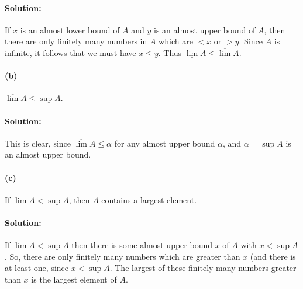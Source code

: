 \documentclass{article}
\begin{document}
\paragraph{Solution:} If $x$ is an almost lower bound of $A$ and $y$ is an
almost upper bound of $A$, then there are only finitely many numbers in $A$
which are $< x$ or $> y$. Since $A$ is infinite, it follows that we must have
$x \leq y$. Thus $\underline{\lim} A \leq \overline{\lim} A$.

\paragraph{(b)} $\overline{\lim} A \leq \sup A$.

\paragraph{Solution:} This is clear, since $\overline{\lim} A \leq \alpha$ for
any almost upper bound $\alpha$, and $\alpha = \sup A$ is an almost upper
bound.

\paragraph{(c)} If $\overline{\lim} A < \sup A$, then $A$ contains a largest
element.

\paragraph{Solution:} If $\overline{\lim} A < \sup A$ then there is some
almost upper bound $x$ of $A$ with $x < \sup A$. So, there are only finitely
many numbers which are greater than $x$ (and there is at least one, since $x <
\sup A$. The largest of these finitely many numbers greater than $x$ is the
largest element of $A$.
\end{document}
